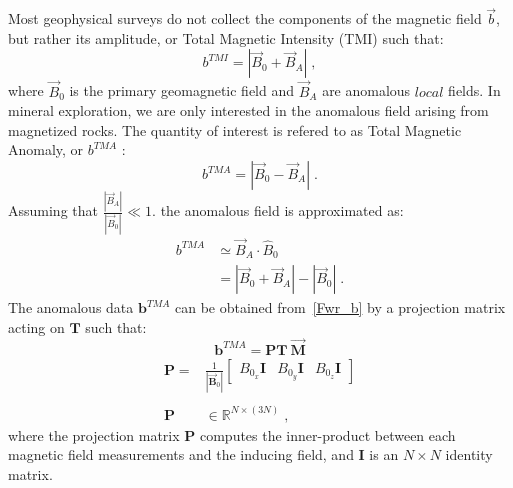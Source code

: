Most geophysical surveys do not collect the components of the magnetic field $\vec{ {b}}$, but rather its amplitude, or Total Magnetic Intensity (TMI) such that:
\begin{equation}
	{b}^{TMI} = |\vec {{B}}_0 + \vec {{B}}_A| \;,
\end{equation}
where $\vec B_0$ is the primary geomagnetic field and $\vec B_{A}$ are anomalous $local$ fields. 
In mineral exploration, we are only interested in the anomalous field arising from magnetized rocks.
The quantity of interest is refered to as Total Magnetic Anomaly, or ${b}^{TMA} $ :
\begin{equation}
	{b}^{TMA} = |\vec {{B}}_0 - \vec {{B}}_A|  \;.
\end{equation}
Assuming that $\frac{|\vec {{B}}_A|}{|\vec {{B}}_0|} \ll 1$.  the anomalous field is approximated as:
\begin{equation}
\begin{split}
	{b}^{TMA} & \simeq  \vec {{B}}_A \cdot \hat {{B}}_0 \\
	& = |\vec {{B}}_0 + \vec {{B}}_A| - |\vec {{B}}_0| \;.
\end{split}
\end{equation}
The anomalous data $\mathbf{b}^{TMA}$ can be obtained from~\ref{Fwr_b} by a projection matrix acting on $\mathbf{T}$ such that:
\begin{equation}\label{bTMI}
	\mathbf{b}^{TMA} = \mathbf{PT}\:\vec {\mathbf{M}}
\end{equation}
\begin{equation}
\begin{split}
	\mathbf{P} =& \frac{1}{|\vec {\mathbf{B}}_0|}	
	\begin{bmatrix}
	B_{0_x}\mathbf{I} & B_{0_y}\mathbf{I} & B_{0_z}\mathbf{I}
	\end{bmatrix} \\ \\
	\mathbf{P} &\in \mathbb{R}^{N \times (3N)} \; ,
	\end{split}
\end{equation}
where the projection matrix $\mathbf{P}$ computes the inner-product between each magnetic field measurements and the inducing field, and $\mathbf{I}$ is an $N\times N$ identity matrix.

